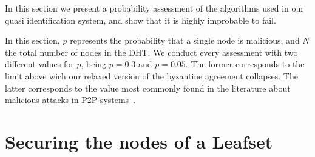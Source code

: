 In this section we present a probability assessment of
the algorithms used in our quasi identification system, and show that it is highly
improbable to fail.

In this section, $p$ represents the probability that a single node is
malicious, and $N$ the total number of nodes in the DHT. We conduct every
assessment with two different values for $p$, being $p = 0.3$ and $p = 0.05$.
The former corresponds to the limit above wich our relaxed version of the
byzantine agreement collapses. The latter corresponds to the value most
commonly found in the literature about malicious attacks in P2P
systems~\cite{p2p_certification}.


\section{Securing the nodes of a Leafset}
\label{sec:eval_leafset}
  
